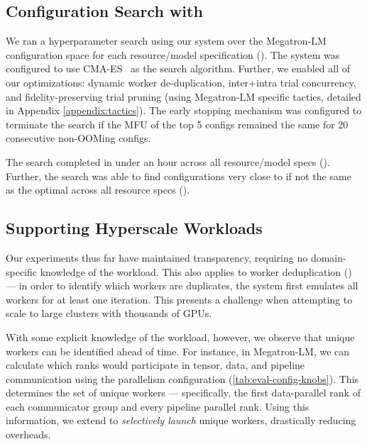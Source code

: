 



\subsection{Configuration Search with \sysname}
\label{sec:eval:opti}


We ran a hyperparameter search using our system over the Megatron-LM configuration space for each resource/model specification (). The system was configured to use CMA-ES~\cite{cma, hansen2001completely} as the search algorithm. Further, we enabled all of our optimizations: dynamic worker de-duplication, inter+intra trial concurrency, and fidelity-preserving trial pruning (using Megatron-LM specific tactics, detailed in Appendix \ref{appendix:tactics}). The early stopping mechanism was configured to terminate the search if the MFU of the top 5 configs remained the same for 20 consecutive non-OOMing configs.



 The search completed in under an hour across all resource/model specs (). %
Further, the search was able to find configurations very close to if not the same as the optimal across all resource specs ().




\subsection{Supporting Hyperscale Workloads}
\label{sec:eval:hyperscale}

Our experiments thus far have maintained transparency, requiring no domain-specific knowledge of the workload. This also applies to worker deduplication () --- in order to identify which workers are duplicates, the system first emulates all workers for at least one iteration. This presents a challenge when attempting to scale \sysname to large clusters with thousands of GPUs.

With some explicit knowledge of the workload, however, we observe that unique workers can be identified ahead of time. For instance, in Megatron-LM, we can calculate which ranks would participate in tensor, data, and pipeline communication using the parallelism configuration (\cref{tab:eval-config-knobs}). This determines the set of unique workers --- specifically, the first data-parallel rank of each communicator group and every pipeline parallel rank. Using this information, we extend \sysname to \textit{selectively launch} unique workers, drastically reducing overheads. 


